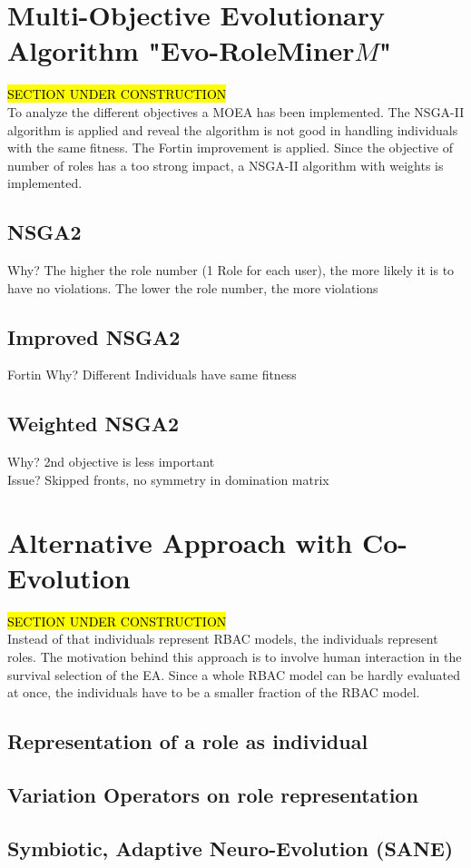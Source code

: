     \section{Multi-Objective Evolutionary Algorithm "Evo-RoleMiner$M$"}
    \hl{SECTION UNDER CONSTRUCTION}\\
    To analyze the different objectives a MOEA has been implemented. The NSGA-II algorithm is applied and reveal the algorithm is not good in handling individuals with the same fitness. The Fortin improvement is applied. Since the objective of number of roles has a too strong impact, a NSGA-II algorithm with weights is implemented.
        \subsection{NSGA2}
        Why? The higher the role number (1 Role for each user), the more likely it is to have no violations. The lower the role number, the more violations
        \subsection{Improved NSGA2}
        Fortin
        Why? Different Individuals have same fitness
        \subsection{Weighted NSGA2}
        Why? 2nd objective is less important\\
        Issue? Skipped fronts, no symmetry in domination matrix

    \section{Alternative Approach with Co-Evolution}
    \hl{SECTION UNDER CONSTRUCTION}\\
    Instead of that individuals represent RBAC models, the individuals represent roles. The motivation behind this approach is to involve human interaction in the survival selection of the EA. Since a whole RBAC model can be hardly evaluated at once, the individuals have to be a smaller fraction of the RBAC model.
        \subsection{Representation of a role as individual}
        \subsection{Variation Operators on role representation}
        \subsection{Symbiotic, Adaptive Neuro-Evolution (SANE)}
